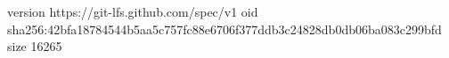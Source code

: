 version https://git-lfs.github.com/spec/v1
oid sha256:42bfa18784544b5aa5c757fc88e6706f377ddb3c24828db0db06ba083c299bfd
size 16265
